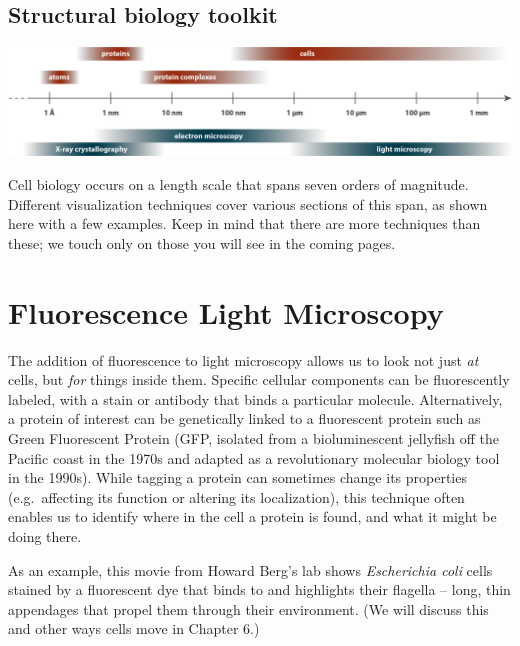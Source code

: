 \documentclass[]{tufte-book}
\begin{document}
\subsection{Structural biology
toolkit}\label{Structural_biology_toolkit}

\includegraphics{img/schematics/1_1_1}

Cell biology occurs on a length scale that spans seven orders of
magnitude. Different visualization techniques cover various sections of
this span, as shown here with a few examples. Keep in mind that there
are more techniques than these; we touch only on those you will see in
the coming pages.

\section{Fluorescence Light
Microscopy}\label{fluorescence-light-microscopy}

The addition of fluorescence to light microscopy allows us to look not
just \emph{at} cells, but \emph{for} things inside them. Specific
cellular components can be fluorescently labeled, with a stain or
antibody that binds a particular molecule. Alternatively, a protein of
interest can be genetically linked to a fluorescent protein such as
Green Fluorescent Protein (GFP, isolated from a bioluminescent jellyfish
off the Pacific coast in the 1970s and adapted as a revolutionary
molecular biology tool in the 1990s). While tagging a protein can
sometimes change its properties (e.g.~affecting its function or altering
its localization), this technique often enables us to identify where in
the cell a protein is found, and what it might be doing there.

As an example, this movie from Howard Berg's lab \citep{bergInternet}
\citep{turner2000} shows \emph{Escherichia coli} cells stained by a
fluorescent dye that binds to and highlights their flagella -- long,
thin appendages that propel them through their environment. (We will
discuss this and other ways cells move in Chapter 6.)
\end{document}
